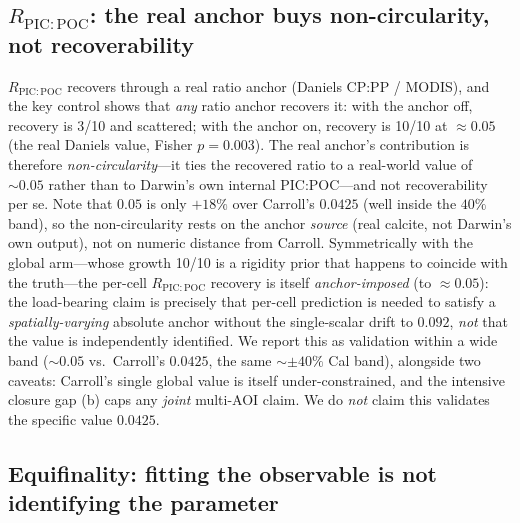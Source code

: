 \documentclass[11pt]{article}
\begin{document}
\subsection{$R_{\mathrm{PIC:POC}}$: the real anchor buys non-circularity, not recoverability}
\label{sec:results-rpicpoc}

$R_{\mathrm{PIC:POC}}$ recovers through a real ratio anchor (Daniels CP:PP /
MODIS), and the key control shows that \emph{any} ratio anchor recovers it: with
the anchor off, recovery is 3/10 and scattered; with the anchor on, recovery is
10/10 at ${\approx}0.05$ (the real Daniels value, Fisher $p=0.003$). The real
anchor's contribution is
therefore \emph{non-circularity}---it ties the recovered ratio to a real-world
value of ${\sim}0.05$ rather than to Darwin's own internal PIC:POC---and not
recoverability per se. Note that $0.05$ is only $+18\%$ over Carroll's $0.0425$
(well inside the $40\%$ band), so the non-circularity rests on the anchor
\emph{source} (real calcite, not Darwin's own output), not on numeric distance
from Carroll. Symmetrically with the global arm---whose growth 10/10 is a rigidity
prior that happens to coincide with the truth---the per-cell
$R_{\mathrm{PIC:POC}}$ recovery is itself \emph{anchor-imposed} (to ${\approx}0.05$):
the load-bearing claim is precisely that per-cell prediction is needed to satisfy a
\emph{spatially-varying} absolute anchor without the single-scalar drift to
$0.092$, \emph{not} that the value is independently identified. We report this as
validation within a wide band
(${\sim}0.05$ vs.\ Carroll's $0.0425$, the same ${\sim}{\pm}40\%$ Cal band),
alongside two caveats: Carroll's single global value is itself under-constrained,
and the intensive closure gap (b) caps any \emph{joint} multi-AOI claim. We do
\emph{not} claim this validates the specific value $0.0425$.

\subsection{Equifinality: fitting the observable is not identifying the parameter}
\label{sec:results-equifinality}
\end{document}
